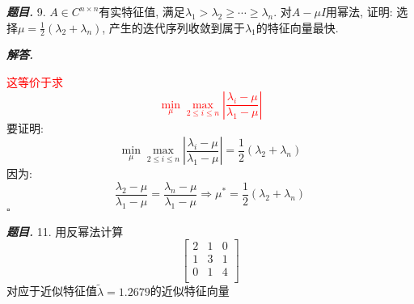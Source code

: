 \documentclass[10pt, a4paper, oneside]{ctexart}
\newenvironment{problem}{\begin{framed}\par\noindent\textbf{\textit{题目. }}}{\end{framed}\par}
\newenvironment{solution}{%
  \par\noindent\textbf{\textit{解答. }}\ignorespaces
}{%
  \hfill\ensuremath{\square}\par %
}
\begin{document}
\begin{problem}
    9. $A\in C^{n\times n}$有实特征值, 满足$\lambda_1>\lambda_2\geq \cdots \geq \lambda_n$. 对$A-\mu I$用幂法, 证明: 选择$\mu=\frac{1}{2}(\lambda_2+\lambda_n)$, 产生的迭代序列收敛到属于$\lambda_1$的特征向量最快.
\end{problem}
\begin{solution}
\textcolor{red}{这等价于求
$$\min_{\mu} \max_{2\leq i\leq n} |\frac{\lambda_i-\mu}{\lambda_1-\mu}|$$}
要证明:
$$\min_{\mu} \max_{2\leq i\leq n} |\frac{\lambda_i-\mu}{\lambda_1-\mu}|=\frac{1}{2}(\lambda_2+\lambda_n)$$
因为:
$$\frac{\lambda_2-\mu}{\lambda_1-\mu}=\frac{\lambda_n-\mu}{\lambda_1-\mu}\Rightarrow \mu^*=\frac{1}{2}(\lambda_2+\lambda_n)$$
\end{solution}

\begin{problem}
    11. 用反幂法计算 
    $$\begin{bmatrix}
        2&1&0\\
        1&3&1\\
        0&1&4\\
    \end{bmatrix}$$
    对应于近似特征值$\tilde{\lambda}=1.2679$的近似特征向量
\end{problem}
\end{document}
